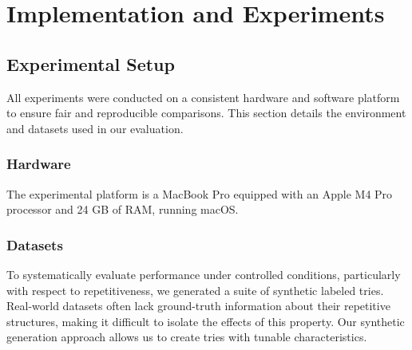 \chapter{Implementation and Experiments} \label{chp:experiments}

\section{Experimental Setup}
All experiments were conducted on a consistent hardware and software platform to ensure fair and reproducible comparisons. This section details the environment and datasets used in our evaluation.

\subsection{Hardware}
The experimental platform is a MacBook Pro equipped with an Apple M4 Pro processor and 24 GB of RAM, running macOS. 

\subsection{Datasets}
To systematically evaluate performance under controlled conditions, particularly with respect to repetitiveness, we generated a suite of synthetic labeled tries. Real-world datasets often lack ground-truth information about their repetitive structures, making it difficult to isolate the effects of this property. Our synthetic generation approach allows us to create tries with tunable characteristics.

